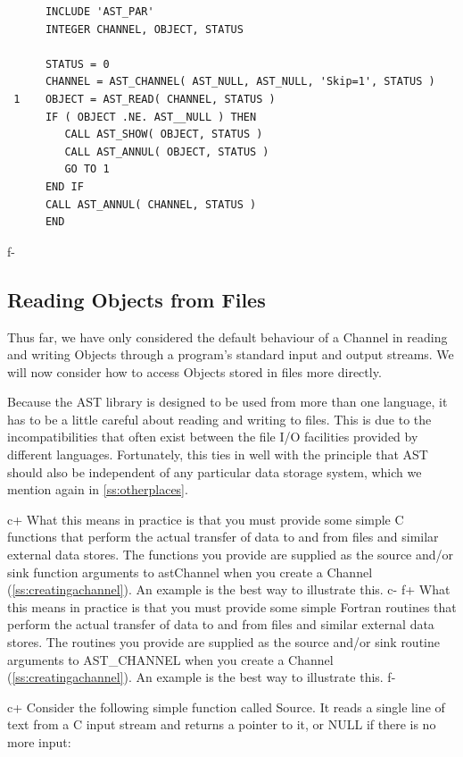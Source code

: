\documentclass[twoside,11pt]{article}
\newcommand{\secref}[1]{\S\ref{#1}}
\renewcommand{\secref}[1]{\ref{#1}}
\begin{document}
\small
\begin{verbatim}
      INCLUDE 'AST_PAR'
      INTEGER CHANNEL, OBJECT, STATUS

      STATUS = 0      
      CHANNEL = AST_CHANNEL( AST_NULL, AST_NULL, 'Skip=1', STATUS )
 1    OBJECT = AST_READ( CHANNEL, STATUS )
      IF ( OBJECT .NE. AST__NULL ) THEN
         CALL AST_SHOW( OBJECT, STATUS )
         CALL AST_ANNUL( OBJECT, STATUS )
         GO TO 1
      END IF
      CALL AST_ANNUL( CHANNEL, STATUS )
      END
\end{verbatim}
\normalsize
f-

\subsection{\label{ss:channelsource}Reading Objects from Files}

Thus far, we have only considered the default behaviour of a Channel
in reading and writing Objects through a program's standard input and
output streams. We will now consider how to access Objects stored in
files more directly.

Because the AST library is designed to be used from more than one
language, it has to be a little careful about reading and writing to
files. This is due to the incompatibilities that often exist between
the file I/O facilities provided by different languages.  Fortunately,
this ties in well with the principle that AST should also be
independent of any particular data storage system, which we mention
again in \secref{ss:otherplaces}.

c+
What this means in practice is that you must provide some simple C
functions that perform the actual transfer of data to and from files
and similar external data stores. The functions you provide are
supplied as the source and/or sink function arguments to astChannel
when you create a Channel (\secref{ss:creatingachannel}). An example is
the best way to illustrate this.
c-
f+
What this means in practice is that you must provide some simple
Fortran routines that perform the actual transfer of data to and from
files and similar external data stores. The routines you provide are
supplied as the source and/or sink routine arguments to AST\_CHANNEL
when you create a Channel (\secref{ss:creatingachannel}). An example is
the best way to illustrate this.
f-

c+
Consider the following simple function called Source. It reads a
single line of text from a C input stream and returns a pointer to it,
or NULL if there is no more input:
\end{document}

